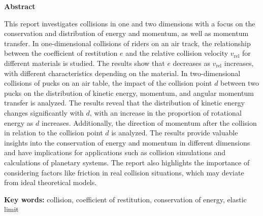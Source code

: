 \centerline{\bf Abstract}
\noindent This report investigates collisions in one and two dimensions with a focus on the conservation and distribution of energy and momentum, as well as momentum transfer. In one-dimensional collisions of riders on an air track, the relationship between the coefficient of restitution $e$ and the relative collision velocity $v_{\text{rel}}$ for different materials is studied. The results show that $e$ decreases as $v_{\text{rel}}$ increases, with different characteristics depending on the material. In two-dimensional collisions of pucks on an air table, the impact of the collision point $d$ between two pucks on the distribution of kinetic energy, momentum, and angular momentum transfer is analyzed. The results reveal that the distribution of kinetic energy changes significantly with $d$, with an increase in the proportion of rotational energy as $d$ increases. Additionally, the direction of momentum after the collision in relation to the collision point $d$ is analyzed. The results provide valuable insights into the conservation of energy and momentum in different dimensions and have implications for applications such as collision simulations and calculations of planetary systems. The report also highlights the importance of considering factors like friction in real collision situations, which may deviate from ideal theoretical models.

{\bf Key words:} collision, coefficient of restitution, conservation of energy, elastic limit

